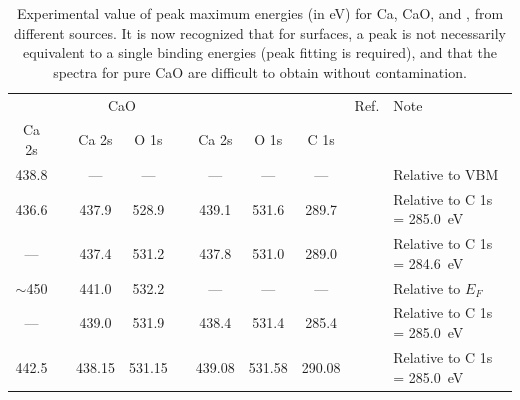 \documentclass[%
aip,
amsmath,amssymb,
preprint,%
]{revtex4-2}
\begin{document}
\begin{table}[!h]
	\caption{Experimental value of peak maximum energies  (in \si{\electronvolt}) for Ca, CaO, and  , from different sources. It is now recognized that for surfaces, a peak is not necessarily equivalent to a single binding energies (peak fitting is required), and that the spectra for pure CaO are difficult to obtain without contamination.\cite{dupinSystematicXPSStudies2000}}
	\begin{ruledtabular}
		\begin{tabular}{c ccc c ccc cl}
			\ce{Ca^0} & & \multicolumn{2}{c}{CaO} & & \multicolumn{3}{c}{\ce{CaCO3}} & Ref. & Note\\
			\cline{1-1} \cline{3-4} \cline{6-8}
			Ca 2s & & Ca 2s & O 1s  & & Ca 2s & O 1s & C 1s\\
			\hline
			438.8 & &---&---&& --- & --- &--- & \citenum{fuggleCorelevelBindingEnergies1980} & Relative to VBM\\
			436.6 & & 437.9 & 528.9& & 439.1 &531.6 & 289.7& \citenum{sosulnikovXrayPhotoelectronStudies1992}& Relative to C 1s = \SI{285.0}{\electronvolt}\\
			--- && 437.4 & 531.2&& 437.8 & 531.0 & 289.0 & \citenum{demriXPSStudyCalcium1995} & Relative to C 1s = \SI{284.6}{\electronvolt}\\
			$\sim$450 & & 441.0 & 532.2 & & --- & --- & --- & \citenum{ochsCO2ChemisorptionCa1998} & Relative to $E_F$ \\
			--- & & 439.0 & 531.9 & & 438.4 & 531.4 & 285.4 & \citenum{cristHandbookMonochromaticXPS2000a} & Relative to C 1s = \SI{285.0}{\electronvolt}\\
			442.5 & & 438.15 & 531.15 & & 439.08 & 531.58 & 290.08 & \citenum{cristXPSLibraryWebsite2021a} & Relative to C 1s = \SI{285.0}{\electronvolt}\\
			
		\end{tabular}
	\end{ruledtabular}
\end{table}
\end{document}
